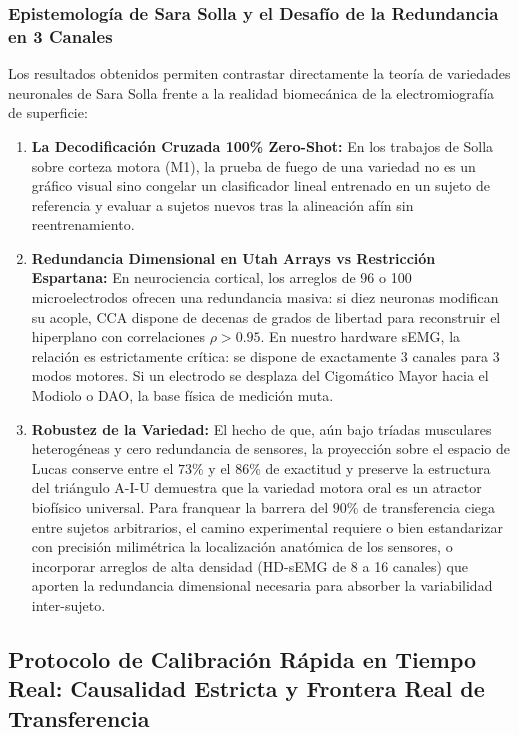 \documentclass[11pt,a4paper]{article}
\begin{document}
\subsubsection{Epistemología de Sara Solla y el Desafío de la Redundancia en 3 Canales}
\label{subsubsec:epistemologia_sara_solla}

Los resultados obtenidos permiten contrastar directamente la teoría de variedades neuronales de Sara Solla frente a la realidad biomecánica de la electromiografía de superficie:
\begin{enumerate}
    \item \textbf{La Decodificación Cruzada 100\% Zero-Shot:} En los trabajos de Solla sobre corteza motora (M1), la prueba de fuego de una variedad no es un gráfico visual sino congelar un clasificador lineal entrenado en un sujeto de referencia y evaluar a sujetos nuevos tras la alineación afín sin reentrenamiento.
    \item \textbf{Redundancia Dimensional en Utah Arrays vs Restricción Espartana:} En neurociencia cortical, los arreglos de 96 o 100 microelectrodos ofrecen una redundancia masiva: si diez neuronas modifican su acople, CCA dispone de decenas de grados de libertad para reconstruir el hiperplano con correlaciones $\rho > 0.95$. En nuestro hardware sEMG, la relación es estrictamente crítica: se dispone de exactamente $3$ canales para $3$ modos motores. Si un electrodo se desplaza del Cigomático Mayor hacia el Modiolo o DAO, la base física de medición muta.
    \item \textbf{Robustez de la Variedad:} El hecho de que, aún bajo tríadas musculares heterogéneas y cero redundancia de sensores, la proyección sobre el espacio de Lucas conserve entre el $73\%$ y el $86\%$ de exactitud y preserve la estructura del triángulo A-I-U demuestra que la variedad motora oral es un atractor biofísico universal. Para franquear la barrera del $90\%$ de transferencia ciega entre sujetos arbitrarios, el camino experimental requiere o bien estandarizar con precisión milimétrica la localización anatómica de los sensores, o incorporar arreglos de alta densidad (HD-sEMG de 8 a 16 canales) que aporten la redundancia dimensional necesaria para absorber la variabilidad inter-sujeto.
\end{enumerate}

\subsection{Protocolo de Calibración Rápida en Tiempo Real: Causalidad Estricta y Frontera Real de Transferencia}
\label{subsec:calibracion_rapida_tiempo_real}
\end{document}
